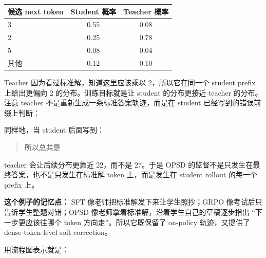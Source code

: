 \begin{center}
\begin{tabular}{lcc}
\toprule
\textbf{候选 next token} & \textbf{Student 概率} & \textbf{Teacher 概率}\\
\midrule
$3$ & 0.55 & 0.08\\
$2$ & 0.25 & 0.78\\
$5$ & 0.08 & 0.04\\
其他 & 0.12 & 0.10\\
\bottomrule
\end{tabular}
\end{center}

Teacher 因为看过标准解，知道这里应该乘以 2，所以它在同一个 student prefix 上给出更偏向 $2$ 的分布。训练目标就是让 student 的分布更接近 teacher 的分布。注意 teacher 不是重新生成一条标准答案轨迹，而是在 student 已经写到的错误前缀上判断：

同样地，当 student 后面写到：

\begin{quote}
所以总共是
\end{quote}

teacher 会让后续分布更靠近 22，而不是 27。于是 OPSD 的监督不是只发生在最终答案，也不是只发生在标准解 token 上，而是发生在 student rollout 的每一个 prefix 上。

\begin{intubox}
\textbf{这个例子的记忆点：} SFT 像老师把标准解发下来让学生照抄；GRPO 像考试后只告诉学生整题对错；OPSD 像老师拿着标准解，沿着学生自己的草稿逐步指出 ``下一步更应该往哪个 token 方向走''。所以它既保留了 on-policy 轨迹，又提供了 dense token-level soft correction。
\end{intubox}

用流程图表示就是：

